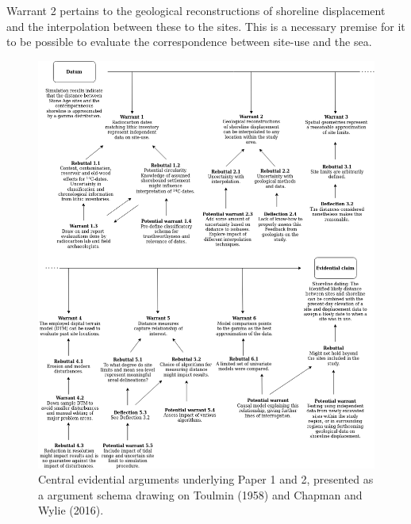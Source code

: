 \documentclass[
  12pt,
  a4paper,
  oneside]{book}
\begin{document}
Warrant 2 pertains to the geological reconstructions of shoreline displacement and the interpolation between these to the sites. This is a necessary premise for it to be possible to evaluate the correspondence between site-use and the sea.

\begin{figure}

{\centering \includegraphics[width=1.05\linewidth]{figures/toulmin_p1} 

}

\caption{Central evidential arguments underlying Paper 1 and 2, presented as a argument schema drawing on Toulmin (1958) and Chapman and Wylie (2016).}\label{fig:t1}
\end{figure}
\end{document}
